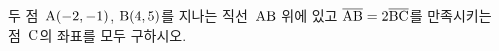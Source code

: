 두 점~$\mathrm{A}(-2{,}\mkern3mu\mathopen{}-1)$, $\mathrm{B}(4{,}\mkern3mu\mathopen{}5)$를 지나는 직선~$\mathrm{AB}$ 위에 있고 $\overline{\mathrm{AB}}=2\overline{\mathrm{BC}}$를 만족시키는 점~$\mathrm{C}$의 좌표를 모두 구하시오.
